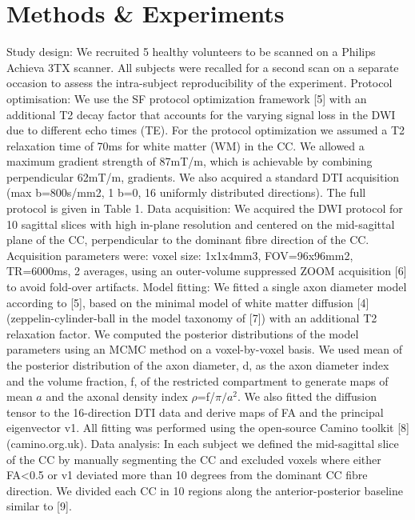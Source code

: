 \section{Methods \& Experiments}
Study design: We recruited 5 healthy volunteers to be scanned on a Philips Achieva 3TX scanner. All subjects were recalled for a second scan on a separate occasion to assess the intra-subject reproducibility of the experiment.
Protocol optimisation: We use the SF protocol optimization framework [5] with an additional T2 decay factor that accounts for the varying signal loss in the DWI due to different echo times (TE). For the protocol optimization we assumed a T2 relaxation time of 70ms for white matter (WM) in the CC. We allowed a maximum gradient strength of 87mT/m, which is achievable by combining perpendicular 62mT/m, gradients. We also acquired a standard DTI acquisition (max b=800s/mm2, 1 b=0, 16 uniformly distributed directions). The full protocol is given in Table 1.
Data acquisition: We acquired the DWI protocol for 10 sagittal slices with high in-plane resolution and centered on the mid-sagittal plane of the CC, perpendicular to the dominant fibre direction of the CC. Acquisition parameters were: voxel size: 1x1x4mm3, FOV=96x96mm2, TR=6000ms, 2 averages, using an outer-volume suppressed ZOOM acquisition [6] to avoid fold-over artifacts.  
Model fitting: We fitted a single axon diameter model according to [5], based on the minimal model of white matter diffusion [4] (zeppelin-cylinder-ball in the model taxonomy of [7]) with an additional T2 relaxation factor. We computed the posterior distributions of the model parameters using an MCMC method on a voxel-by-voxel basis.  We used mean of the posterior distribution of the axon diameter, d, as the axon diameter index and the volume fraction, f, of the restricted compartment to generate maps of mean $a$ and the axonal density index $\rho$=f/$\pi/a^2$. We also fitted the diffusion tensor to the 16-direction DTI data and derive maps of FA and the principal eigenvector v1. All fitting was performed using the open-source Camino toolkit [8] (camino.org.uk).
Data analysis: In each subject we defined the mid-sagittal slice of the CC by manually segmenting the CC and excluded voxels where either FA<0.5 or v1 deviated more than 10 degrees from the dominant CC fibre direction. We divided each CC in 10 regions along the anterior-posterior baseline similar to [9]. 
